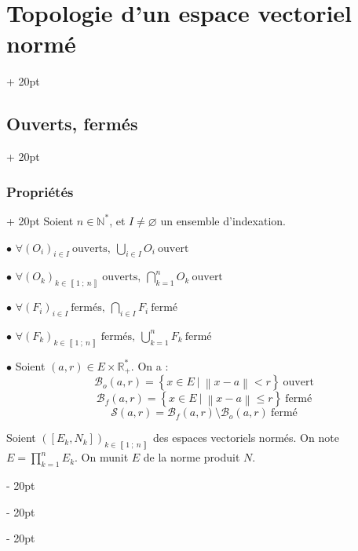 \documentclass[a4paper, 12pt, twoside]{article}
\newcommand{\N}{\mathbb{N}} %
\newcommand{\R}{\mathbb{R}} %
\newcommand{\nset}[2]{\left\llbracket #1\ ;\ #2 \right\rrbracket}
\newcommand{\lr}[1]{\left( #1 \right)}
\newcommand{\set}[1]{\left\{ #1 \right\}}
\newcommand{\norm}[1]{\left\lVert #1 \right\rVert}
\renewcommand{\le}{\leqslant}
\newcommand{\ind}[1][20pt]{\advance\leftskip + #1}
\newcommand{\deind}[1][20pt]{\advance\leftskip - #1}
\newenvironment{indt}[2][20pt]{#2 \par \ind[#1]}{\par \deind} %
\begin{document}
\begin{indt}{\section{Topologie d'un espace vectoriel normé}}
\begin{indt}{\subsection{Ouverts, fermés}}
            \vspace{12pt}
            
            \begin{indt}{\subsubsection{Propriétés}}
                Soient $n \in \N^*$, et $I \neq \varnothing$ un ensemble d'indexation.

                \vspace{12pt}
                
                $\bullet$
                $
                    \displaystyle
                    \forall (O_i)_{i \in I}\ \text{ouverts},\
                    \bigcup_{i \in I} O_i\ \text{ouvert}
                $

                $\bullet$
                $
                    \displaystyle
                    \forall (O_k)_{k \in \nset 1 n}\ \text{ouverts},\
                    \bigcap_{k = 1}^n O_k\ \text{ouvert}
                $

                \vspace{6pt}
                
                $\bullet$
                $
                    \displaystyle
                    \forall (F_i)_{i \in I}\ \text{fermés},\
                    \bigcap_{i \in I} F_i\ \text{fermé}
                $

                $\bullet$
                $
                    \displaystyle
                    \forall (F_k)_{k \in \nset 1 n}\ \text{fermés},\
                    \bigcup_{k = 1}^n F_k\ \text{fermé}
                $

                \vspace{12pt}
                
                $\bullet$ Soient $(a, r) \in E \times \R^*_+$. On a :
                \[
                    \mathscr B_o(a, r) = \set{x \in E\ |\ \norm{x - a} < r}\ \text{ouvert}
                \]
                \[
                    \mathscr B_f(a, r) = \set{x \in E\ |\ \norm{x - a} \le r}\ \text{fermé}
                \]
                \[
                    \mathscr S(a, r) = \mathscr B_f(a, r) \setminus \mathscr B_o(a, r)\ \text{fermé}
                \]

                \vspace{12pt}
                
                Soient $\displaystyle \lr{[E_k, N_k]}_{k \in \nset 1 n}$ des espaces vectoriels normés.
                On note $E = \displaystyle \prod_{k = 1}^n E_k$.
                On munit $E$ de la norme produit $N$.


\end{indt}
\end{indt}
\end{indt}
\end{document}
